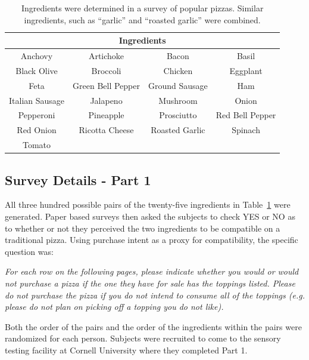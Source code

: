 \begin{table}[h!b!p!]
\caption[Top 25 pizza ingredients from survey.]{Ingredients were determined in a survey of popular pizzas.  Similar ingredients, such as “garlic” and “roasted garlic” were combined.}
\centering
\begin{tabular}{cccc}
\toprule
\multicolumn{4}{c}{Ingredients}\\
\midrule
Anchovy 	& 	Artichoke 	& 	Bacon 		& 	Basil \\
Black Olive	& 	Broccoli 	& 	Chicken 	& 	Eggplant \\
Feta 		& 	Green Bell Pepper &	Ground Sausage & 	Ham \\
Italian Sausage & 	Jalapeno 	& 	Mushroom	&	Onion \\
Pepperoni 	& 	Pineapple 	& 	Prosciutto 	& Red Bell Pepper \\
Red Onion 	& 	Ricotta Cheese & 	Roasted Garlic & Spinach \\
Tomato \\
\bottomrule
\end{tabular}
\label{tab:pizzaing}
\end{table}

\subsection {Survey Details - Part 1}
All three hundred possible pairs of the twenty-five ingredients in Table~\ref{tab:pizzaing} were generated.  Paper based surveys then asked the subjects to check YES or NO as to whether or not they perceived the two ingredients to be compatible on a traditional pizza.  Using purchase intent as a proxy for compatibility, the specific question was: 

\noindent
{\it For each row on the following pages, please indicate whether you would or would not purchase a pizza if the one they have for sale has the toppings listed. Please do not purchase the pizza if you do not intend to consume all of the toppings (e.g. please do not plan on picking off a topping you do not like).}

Both the order of the pairs and the order of the ingredients within the pairs were randomized for each person.  Subjects were recruited to come to the sensory testing facility at Cornell University where they completed Part 1.

